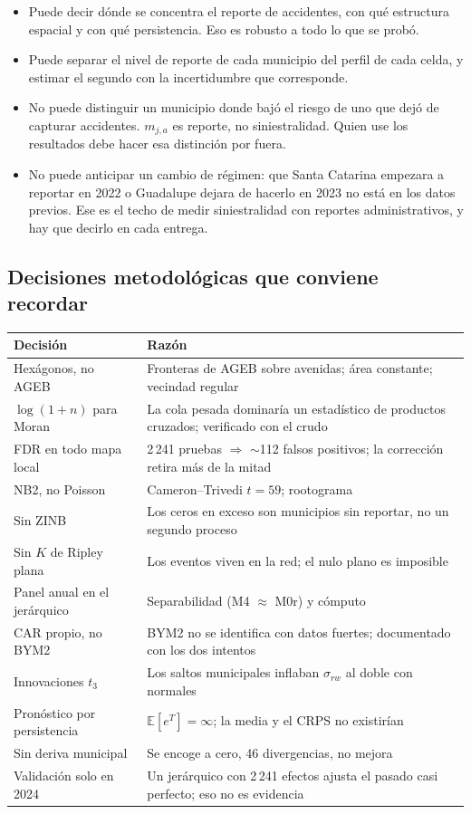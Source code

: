 \documentclass[11pt,a4paper]{article}
\newcommand{\E}{\mathbb{E}}
\begin{document}
\begin{itemize}[leftmargin=1.4em]
\item Puede decir dónde se concentra el reporte de accidentes, con qué
  estructura espacial y con qué persistencia. Eso es robusto a todo lo que se
  probó.
\item Puede separar el nivel de reporte de cada municipio del perfil de cada
  celda, y estimar el segundo con la incertidumbre que corresponde.
\item No puede distinguir un municipio donde bajó el riesgo de uno que dejó
  de capturar accidentes. $m_{j,a}$ es reporte, no siniestralidad. Quien use
  los resultados debe hacer esa distinción por fuera.
\item No puede anticipar un cambio de régimen: que Santa Catarina empezara a
  reportar en 2022 o Guadalupe dejara de hacerlo en 2023 no está en los datos
  previos. Ese es el techo de medir siniestralidad con reportes
  administrativos, y hay que decirlo en cada entrega.
\end{itemize}

\subsection{Decisiones metodológicas que conviene recordar}

\begin{table}[H]
\centering\small
\begin{tabular}{p{4.2cm}p{9.6cm}}
\toprule
Decisión & Razón \\
\midrule
Hexágonos, no AGEB & Fronteras de AGEB sobre avenidas; área constante; vecindad regular \\
$\log(1+n)$ para Moran & La cola pesada dominaría un estadístico de productos cruzados; verificado con el crudo \\
FDR en todo mapa local & 2\,241 pruebas $\Rightarrow$ $\sim$112 falsos positivos; la corrección retira más de la mitad \\
NB2, no Poisson & Cameron--Trivedi $t=59$; rootograma \\
Sin ZINB & Los ceros en exceso son municipios sin reportar, no un segundo proceso \\
Sin $K$ de Ripley plana & Los eventos viven en la red; el nulo plano es imposible \\
Panel anual en el jerárquico & Separabilidad (M4 $\approx$ M0r) y cómputo \\
CAR propio, no BYM2 & BYM2 no se identifica con datos fuertes; documentado con los dos intentos \\
Innovaciones $t_3$ & Los saltos municipales inflaban $\sigma_{rw}$ al doble con normales \\
Pronóstico por persistencia & $\E[e^{T}]=\infty$; la media y el CRPS no existirían \\
Sin deriva municipal & Se encoge a cero, 46 divergencias, no mejora \\
Validación solo en 2024 & Un jerárquico con 2\,241 efectos ajusta el pasado casi perfecto; eso no es evidencia \\
\bottomrule
\end{tabular}
\end{table}
\end{document}
